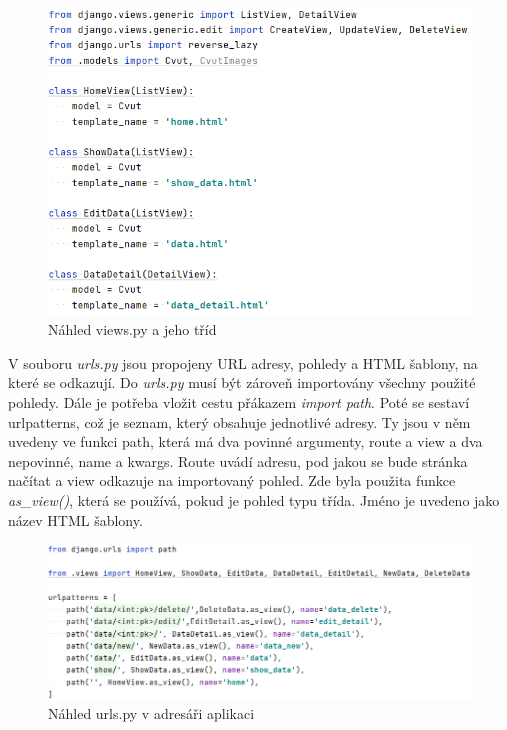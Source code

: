 \begin{figure}[H] \centering
    \includegraphics[width=350pt]{./pictures/6-nahled-views-aplikace.PNG}
    \caption[Náhled views.py a jeho tříd]{Náhled views.py a jeho tříd}
	\label{fig:Náhled views.py a jeho tříd}              
\end{figure}


V souboru \emph{urls.py} jsou propojeny URL adresy, pohledy a HTML
šablony, na které se odkazují. Do \emph{urls.py} musí být zároveň importovány
všechny použité pohledy. Dále je potřeba vložit cestu přákazem \emph{import path}. 
Poté se sestaví urlpatterns, což je seznam, který obsahuje jednotlivé
adresy. Ty jsou v něm uvedeny ve funkci path, která má dva povinné
argumenty, route a view a dva nepovinné, name a kwargs. Route uvádí
adresu, pod jakou se bude stránka načítat a view odkazuje na
importovaný pohled. Zde byla použita funkce \emph{as\_view()}, která
se používá, pokud je pohled typu třída. Jméno je uvedeno jako název
HTML šablony.

\begin{figure}[H] \centering
    \includegraphics[width=450pt]{./pictures/7-urls-aplikace.PNG}
    \caption[Náhled urls.py v adresáři aplikaci]{Náhled urls.py v adresáři aplikaci}
	\label{fig:Náhled urls.py v adresáři aplikaci}              
\end{figure}

